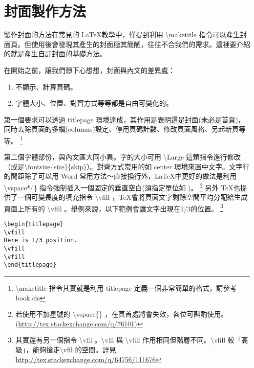 \documentclass[class=NCU_thesis, crop=false]{standalone}
\begin{document}

\section{封面製作方法}

製作封面的方法在常見的 \LaTeX 教學中，僅提到利用 \textbackslash{}maketitle 指令可以產生封面頁。但使用後會發現其產生的封面極其簡陋，往往不合我們的需求。這裡要介紹的就是產生自訂封面的基礎方法。


在開始之前，讓我們靜下心想想，封面與內文的差異處：
\begin{enumerate}
    \item 不顯示、計算頁碼。
    \item 字體大小、位置、對齊方式等等都是自由可變化的。
\end{enumerate}

第一個要求可以透過 titlepage 環境達成，其作用是表明這是封面(未必是首頁)，同時去除頁面的多欄(columns)設定、停用頁碼計數、修改頁面風格、另起新頁等等。
\footnote{\textbackslash{}maketitle 指令其實就是利用 titlepage 定義一個非常簡單的格式，請參考 book.cls }

第二個字體部份，與內文區大同小異。字的大小可用 \textbackslash{}Large 這類指令進行修改（或是\textbackslash{}fontsize\{size\}\{skip\}）。對齊方式常用的如 center 環境來置中文字。文字行的間距除了可以用 Word 常用方法～直接換行外，\LaTeX 中更好的做法是利用\textbackslash{}vspace*\{\} 指令強制插入一個固定的垂直空白(須指定單位如 \vspace*{3mm} )。
\footnote{若使用不加星號的 \textbackslash{}vspace\{\} ，在頁首處將會失效，各位可斟酌使用。(\url{http://tex.stackexchange.com/q/76101})}
另外 \TeX 也提供了一個可變長度的填充指令 \textbackslash{}vfill ，\TeX 會將頁面文字剩餘空間平均分配給生成頁面上所有的 \textbackslash{}vfill 。舉例來說，以下範例會讓文字出現在1/3的位置。
\footnote{其實還有另一個指令 \textbackslash{}vfil 。\textbackslash{}vfil 與 \textbackslash{}vfill 作用相同但階層不同。\textbackslash{}vfill 較「高級」，能夠搶走\textbackslash{}vfil 的空間。詳見\url{http://tex.stackexchange.com/q/64756/111676}}
\begin{lstlisting}
\begin{titlepage}
\vfill
Here is 1/3 position.
\vfill
\vfill
\end{titlepage}
\end{lstlisting}
\end{document}

